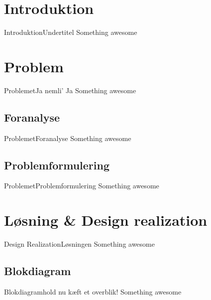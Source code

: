 

\section{Introduktion}
\begin{frame}{Introduktion}{Undertitel}
	Something awesome
\end{frame}


\section{Problem}
\begin{frame}{Problemet}{Ja nemli' Ja}
	Something awesome
\end{frame}

\subsection{Foranalyse}
\begin{frame}{Problemet}{Foranalyse}
	Something awesome
\end{frame}

\subsection{Problemformulering}
\begin{frame}{Problemet}{Problemformulering}
	Something awesome
\end{frame}

\section{Løsning \& Design realization}
\begin{frame}{Design Realization}{Løsningen}
	Something awesome
\end{frame}

\subsection{Blokdiagram}
\begin{frame}{Blokdiagram}{hold nu kæft et overblik!}
	Something awesome
\end{frame}




